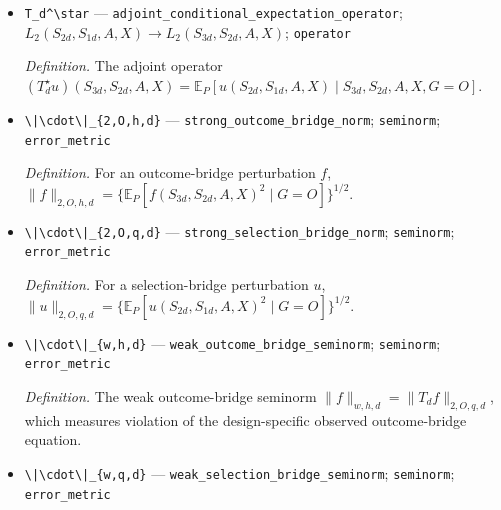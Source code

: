 \documentclass{article}
\begin{document}
\begin{itemize}
  \par\smallskip\noindent\emph{Definition.} The operator \((T_df)(S_{2d},S_{1d},A,X)=\mathbb E_P[f(S_{3d},S_{2d},A,X)\mid S_{2d},S_{1d},A,X,G=O]\).
  \item \texttt{T\_\allowbreak{}d\textasciicircum{}\textbackslash{}\allowbreak{}star} --- \texttt{adjoint\_\allowbreak{}conditional\_\allowbreak{}expectation\_\allowbreak{}operator}; \(L_2(S_{2d},S_{1d},A,X)\to L_2(S_{3d},S_{2d},A,X)\); \texttt{operator}
  \par\smallskip\noindent\emph{Definition.} The adjoint operator \((T_d^\star u)(S_{3d},S_{2d},A,X)=\mathbb E_P[u(S_{2d},S_{1d},A,X)\mid S_{3d},S_{2d},A,X,G=O]\).
  \item \texttt{\textbackslash{}\allowbreak{}|\textbackslash{}\allowbreak{}cdot\textbackslash{}\allowbreak{}|\_\allowbreak{}\{2,\allowbreak{}O,\allowbreak{}h,\allowbreak{}d\}\allowbreak{}} --- \texttt{strong\_\allowbreak{}outcome\_\allowbreak{}bridge\_\allowbreak{}norm}; \texttt{seminorm}; \texttt{error\_\allowbreak{}metric}
  \par\smallskip\noindent\emph{Definition.} For an outcome-bridge perturbation \(f\), \(\|f\|_{2,O,h,d}=\{\mathbb E_P[f(S_{3d},S_{2d},A,X)^2\mid G=O]\}^{1/2}\).
  \item \texttt{\textbackslash{}\allowbreak{}|\textbackslash{}\allowbreak{}cdot\textbackslash{}\allowbreak{}|\_\allowbreak{}\{2,\allowbreak{}O,\allowbreak{}q,\allowbreak{}d\}\allowbreak{}} --- \texttt{strong\_\allowbreak{}selection\_\allowbreak{}bridge\_\allowbreak{}norm}; \texttt{seminorm}; \texttt{error\_\allowbreak{}metric}
  \par\smallskip\noindent\emph{Definition.} For a selection-bridge perturbation \(u\), \(\|u\|_{2,O,q,d}=\{\mathbb E_P[u(S_{2d},S_{1d},A,X)^2\mid G=O]\}^{1/2}\).
  \item \texttt{\textbackslash{}\allowbreak{}|\textbackslash{}\allowbreak{}cdot\textbackslash{}\allowbreak{}|\_\allowbreak{}\{w,\allowbreak{}h,\allowbreak{}d\}\allowbreak{}} --- \texttt{weak\_\allowbreak{}outcome\_\allowbreak{}bridge\_\allowbreak{}seminorm}; \texttt{seminorm}; \texttt{error\_\allowbreak{}metric}
  \par\smallskip\noindent\emph{Definition.} The weak outcome-bridge seminorm \(\|f\|_{w,h,d}=\|T_df\|_{2,O,q,d}\), which measures violation of the design-specific observed outcome-bridge equation.
  \item \texttt{\textbackslash{}\allowbreak{}|\textbackslash{}\allowbreak{}cdot\textbackslash{}\allowbreak{}|\_\allowbreak{}\{w,\allowbreak{}q,\allowbreak{}d\}\allowbreak{}} --- \texttt{weak\_\allowbreak{}selection\_\allowbreak{}bridge\_\allowbreak{}seminorm}; \texttt{seminorm}; \texttt{error\_\allowbreak{}metric}

\end{itemize}
\end{document}
